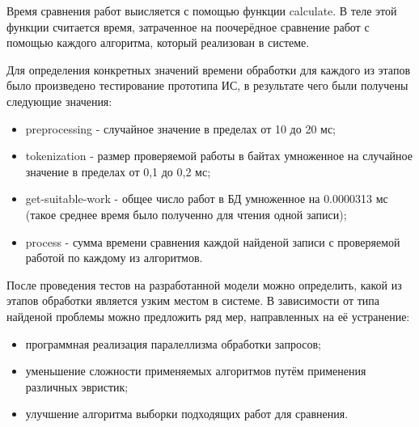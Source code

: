 	Время сравнения работ выисляется с помощью функции calculate. В теле этой функции считается время, затраченное на поочерёдное сравнение работ с помощью каждого алгоритма, который реализован в системе.

	Для определения конкретных значений времени обработки для каждого из этапов было произведено тестирование прототипа ИС, в результате чего были получены следующие значения:
	\begin{itemize}
		\item preprocessing - случайное значение в пределах от 10 до 20 мс;
		\item tokenization - размер проверяемой работы в байтах умноженное на случайное значение в пределах от 0,1 до 0,2 мс;
		\item get-suitable-work - общее число работ в БД умноженное на 0.0000313 мс (такое среднее время было полученно для чтения одной записи);
		\item process - сумма времени сравнения каждой найденой записи с проверяемой работой по каждому из алгоритмов.
	\end{itemize}

	После проведения тестов на разработанной модели можно определить, какой из этапов обработки является узким местом в системе. В зависимости от типа найденой проблемы можно предложить ряд мер, направленных на её устранение:
	\begin{itemize}
		\item программная реализация паралеллизма обработки запросов;
		\item уменьшение сложности применяемых алгоритмов путём применения различных эвристик;
		\item улучшение алгоритма выборки подходящих работ для сравнения.		
	\end{itemize}

